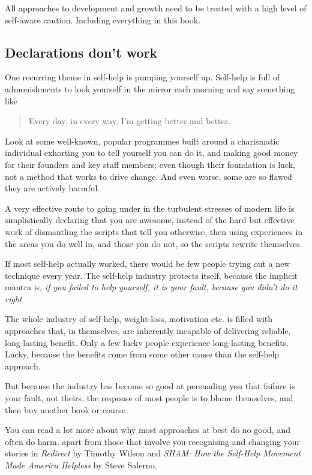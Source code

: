 All approaches to development and growth need to be treated with a high level of self-aware caution. Including everything in this book. 


\subsection{Declarations don't work}
One recurring theme in self-help is pumping yourself up. Self-help is full of admonishments to look yourself in the mirror each morning and say something like \begin{quote}Every day, in every way, I'm getting better and better.\end{quote} 


Look at some well-known, popular programmes built around a charismatic individual exhorting you to tell yourself you can do it, and making good money for their founders and key staff members; even though their foundation is luck, not a method that works\cite{wilson-redirect} to drive change. And even worse, some are so flawed they are actively harmful. 


A very effective route to going under in the turbulent stresses of modern life is simplistically declaring that you are awesome, instead of the hard but effective work of dismantling the scripts that tell you otherwise, then using experiences in the areas you do well in, and those you do not, so the scripts rewrite themselves. 


If most self-help actually worked, there would be few people trying out a new technique every year. The self-help industry protects itself, because the implicit mantra is, \emph{if you failed to help yourself, it is your fault, because you didn’t do it right}. 


The whole industry of self-help, weight-loss, motivation etc. is filled with approaches that, in themselves, are inherently incapable of delivering reliable, long-lasting benefit. Only a few lucky people experience long-lasting benefits. Lucky, because the benefits come from some other cause than the self-help approach. 


But because the industry has become so good at persuading you that failure is your fault, not theirs, the response of most people is to blame themselves, and then buy another book or course. 


You can read a lot more about why most approaches at best do no good, and often do harm, apart from those that involve you recognising and changing your stories in \emph{Redirect} by Timothy Wilson\cite{wilson-redirect}  and \emph{SHAM: How the Self-Help Movement Made America Helpless} by Steve Salerno\cite{salerno-sham}.


